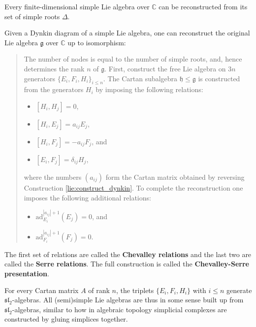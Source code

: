     \begin{theorem}
        Every finite-dimensional simple Lie algebra over $\mathbb{C}$ can be reconstructed from its set of simple roots $\Delta$.
    \end{theorem}
    \begin{construct}\label{lie:reconstruction}
        Given a Dynkin diagram of a simple Lie algebra, one can reconstruct the original Lie algebra $\mathfrak{g}$ over $\mathbb{C}$ up to isomorphism:
        \begin{quote}
            The number of nodes is equal to the number of simple roots, and, hence determines the rank $n$ of $\mathfrak{g}$. First, construct the free Lie algebra on $3n$ generators $\{E_i,F_i,H_i\}_{i\leq n}$. The Cartan subalgebra $\mathfrak{h}\leq\mathfrak{g}$ is constructed from the generators $H_i$ by imposing the following relations:
            \begin{itemize}
                \item $[H_i,H_j] = 0$,
                \item $[H_i,E_j] = a_{ij}E_j$,
                \item $[H_i,F_j] = -a_{ij}F_j$, and
                \item $[E_i,F_j] = \delta_{ij}H_j$,
            \end{itemize}
            where the numbers $(a_{ij})$ form the Cartan matrix obtained by reversing Construction \ref{lie:construct_dynkin}. To complete the reconstruction one imposes the following additional relations:
            \begin{itemize}
                \item $\mathrm{ad}_{E_i}^{|a_{ij}|+1}(E_j) = 0$, and
                \item $\mathrm{ad}_{F_i}^{|a_{ij}|+1}(F_j) = 0$.
            \end{itemize}
        \end{quote}
        The first set of relations are called the \textbf{Chevalley relations} and the last two are called the \textbf{Serre relations}. The full construction is called the \textbf{Chevalley-Serre presentation}.
    \end{construct}

    \begin{property}[$\mathfrak{sl}_2$]
        For every Cartan matrix $A$ of rank $n$, the triplets $\{E_i,F_i,H_i\}$ with $i\leq n$ generate $\mathfrak{sl}_2$-algebras. All (semi)simple Lie algebras are thus in some sense built up from $\mathfrak{sl}_2$-algebras, similar to how in algebraic topology simplicial complexes are constructed by gluing simplices together.
    \end{property}

